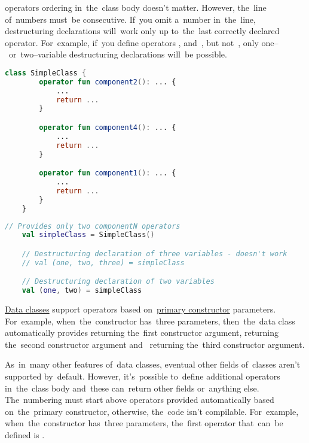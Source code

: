 \noindent {} operators ordering in~the~class body doesn't matter.
However, the~line of~numbers must~be consecutive.
If~you omit a~number in~the~line, destructuring declarations will~work only up to~the~last correctly declared operator.
For~example, if~you define operators ,  and~, but not~, only one--~or~two--variable destructuring declarations will~be possible.

\example
\begin{lstlisting}[language=Kotlin, title={Class with \textit{componentN} operators jumbled and \textit{component3} missing}]
    class SimpleClass {
        operator fun component2(): ... {
            ...
            return ...
        }

        operator fun component4(): ... {
            ...
            return ...
        }

        operator fun component1(): ... {
            ...
            return ...
        }
    }
\end{lstlisting}
\begin{lstlisting}[language=Kotlin, title={Destructuring declaration behavior}]
    // Provides only two componentN operators
    val simpleClass = SimpleClass()

    // Destructuring declaration of three variables - doesn't work
    // val (one, two, three) = simpleClass

    // Destructuring declaration of two variables
    val (one, two) = simpleClass
\end{lstlisting}

\hyperref[kotlindataclass]{Data classes} support  operators based on~\hyperref[kotlinprimaryconstructor]{primary constructor} parameters.
For~example, when~the~constructor has~three parameters, then~the~data class automatically provides  returning the~first constructor argument,  returning the~second constructor argument and~ returning the~third constructor argument.

As~in~many other features of~data classes, eventual other fields of~classes aren't supported by~default.
However, it's~possible to~define additional  operators in~the~class body and~these can~return other fields or~anything else.
The~numbering must start above operators provided automatically based on~the~primary constructor, otherwise, the~code isn't compilable.
For~example, when~the~constructor has~three parameters, the~first operator that~can~be defined is .

